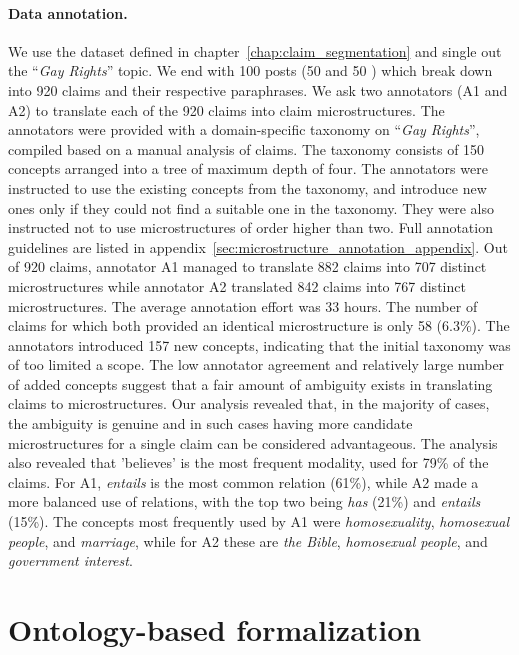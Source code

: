 \paragraph{Data annotation. }
We use the dataset defined in chapter~\ref{chap:claim_segmentation}
and single out the ``\emph{Gay Rights}'' topic. We end with 100 
posts (50  and 50 ) which break down into 920 claims and their
respective paraphrases. We ask two annotators (A1 and A2) to translate each of 
the 920 claims into claim microstructures. The annotators were provided 
with a domain-specific taxonomy on ``\emph{Gay Rights}'', compiled 
based on a manual analysis of claims. The taxonomy consists of 150 concepts
arranged into a tree of maximum depth of four. The annotators
were instructed to use the existing concepts from the taxonomy, and
introduce new ones only if they could not find a suitable one in the
taxonomy. They were also instructed not to use microstructures of order higher 
than two. Full annotation guidelines are listed in
appendix~\ref{sec:microstructure_annotation_appendix}.
Out of 920 claims, annotator A1 managed to translate 882 claims into 707
distinct microstructures while annotator A2 translated 842 claims into
767 distinct microstructures. The average annotation effort was 33 hours. 
The number of claims for which both provided an identical microstructure is only
58 (6.3\%). The annotators introduced 157 new concepts, indicating that the initial 
taxonomy was of too limited a scope. The low annotator agreement and relatively 
large number of added concepts suggest that a fair amount of ambiguity exists
in translating claims to microstructures. Our analysis revealed that, in the majority
of cases, the ambiguity is genuine and in such cases having more candidate 
microstructures for a single claim can be considered advantageous. 
The analysis also revealed that 'believes' is the most frequent modality, used for
79\% of the claims. For A1, \emph{entails} is the most common relation (61\%), while
A2 made a more balanced use of relations, with the top two being \emph{has} (21\%)
and \emph{entails} (15\%). The concepts most frequently used by A1 were
\emph{homosexuality}, \emph{homosexual people}, and \emph{marriage}, while for A2
these are \emph{the Bible}, \emph{homosexual people}, and \emph{government interest}. 

\section{Ontology-based formalization}
\label{sec:ontology_formalization}

